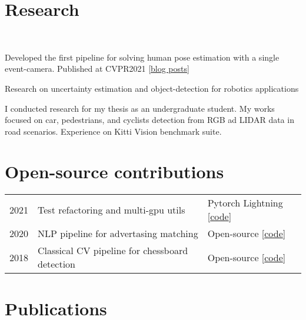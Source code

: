 \documentclass[]{resume}
\begin{document}
\begin{minipage}[t]{0.66\textwidth}
\section{Research}
\\
\begin{tightemize}
\item Developed the first pipeline for solving human pose estimation with a single event-camera. Published at CVPR2021 [\href{https://blog.scarpellini.dev/tags/event-cameras/}{blog posts}]
\item Research on uncertainty estimation and object-detection for robotics applications
\end{tightemize}
\sectionsep
{}
I conducted research for my thesis as an undergraduate student. My works focused on car, pedestrians, and cyclists detection from RGB ad LIDAR data in road scenarios. Experience on Kitti Vision benchmark suite.
\sectionsep


\section{Open-source contributions} 
\begin{tabular}{rll}
2021	     & Test refactoring and multi-gpu utils & Pytorch Lightning [\href{https://github.com/belerico/insertion-matcher}{code}] \\
2020	     & NLP pipeline for advertasing matching  & Open-source [\href{https://github.com/belerico/insertion-matcher}{code}]  \\
2018	     & Classical CV pipeline for chessboard detection & Open-source [\href{https://github.com/gianscarpe/chess_detection}{code}]  \\


\end{tabular}
\sectionsep


\section{Publications} 
\renewcommand\refname{\vskip -1.5em} %


\nocite{*}

\end{minipage} 
\end{document}
